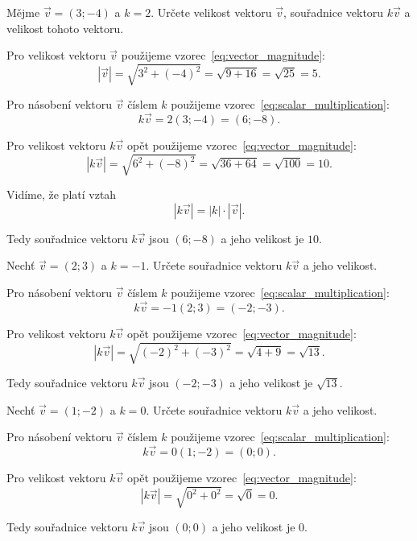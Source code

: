 \begin{example}
    Mějme $\vec{v} = (3; -4)$ a $k = 2$. 
    Určete velikost vektoru $\vec{v}$, souřadnice vektoru $k\vec{v}$ a velikost tohoto vektoru.

    Pro velikost vektoru $\vec{v}$ použijeme vzorec~\eqref{eq:vector_magnitude}:
    \[
    |\vec{v}| = \sqrt{3^2 + (-4)^2} = \sqrt{9 + 16} = \sqrt{25} = 5.
    \]

    Pro násobení vektoru $\vec{v}$ číslem $k$ použijeme vzorec~\eqref{eq:scalar_multiplication}:
    \[
    k\vec{v} = 2(3; -4) = (6; -8).
    \]

    Pro velikost vektoru $k\vec{v}$ opět použijeme vzorec~\eqref{eq:vector_magnitude}:
    \[
    |k\vec{v}| = \sqrt{6^2 + (-8)^2} = \sqrt{36 + 64} = \sqrt{100} = 10.
    \]

    Vidíme, že platí vztah
    \[
    |k\vec{v}| = |k| \cdot |\vec{v}|.
    \]

    Tedy souřadnice vektoru $k\vec{v}$ jsou $(6; -8)$ a jeho velikost je $10$.
\end{example}

\begin{example}
    Nechť $\vec{v} = (2; 3)$ a $k = -1$. Určete souřadnice vektoru $k\vec{v}$ a jeho velikost.

    Pro násobení vektoru $\vec{v}$ číslem $k$ použijeme vzorec~\eqref{eq:scalar_multiplication}:
    \[
    k\vec{v} = -1(2; 3) = (-2; -3).
    \]

    Pro velikost vektoru $k\vec{v}$ opět použijeme vzorec~\eqref{eq:vector_magnitude}:
    \[
    |k\vec{v}| = \sqrt{(-2)^2 + (-3)^2} = \sqrt{4 + 9} = \sqrt{13}.
    \]

    Tedy souřadnice vektoru $k\vec{v}$ jsou $(-2; -3)$ a jeho velikost je $\sqrt{13}$.
\end{example}

\begin{example}
    Nechť $\vec{v} = (1; -2)$ a $k = 0$. Určete souřadnice vektoru $k\vec{v}$ a jeho velikost.

    Pro násobení vektoru $\vec{v}$ číslem $k$ použijeme vzorec~\eqref{eq:scalar_multiplication}:
    \[
    k\vec{v} = 0(1; -2) = (0; 0).
    \]

    Pro velikost vektoru $k\vec{v}$ opět použijeme vzorec~\eqref{eq:vector_magnitude}:
    \[
    |k\vec{v}| = \sqrt{0^2 + 0^2} = \sqrt{0} = 0.
    \]

    Tedy souřadnice vektoru $k\vec{v}$ jsou $(0; 0)$ a jeho velikost je $0$.
\end{example}



